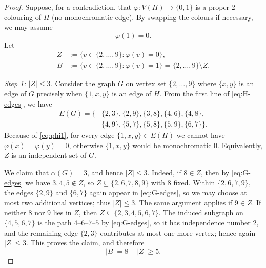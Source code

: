 \documentclass[11pt]{amsart}
\theoremstyle{definition}
\theoremstyle{remark}
\newcommand{\V}{V}
\newcommand{\E}{E}
\begin{document}
\begin{proof}
Suppose, for a contradiction, that $\varphi:\V(H)\to\{0,1\}$ is a proper $2$-colouring of $H$ (no monochromatic edge).
By swapping the colours if necessary, we may assume
\begin{equation}\label{eq:phi1}
\varphi(1)=0.
\end{equation}
Let
\[
\begin{aligned}
Z&:=\{v\in\{2,\dots,9\}:\varphi(v)=0\},\\
B&:=\{v\in\{2,\dots,9\}:\varphi(v)=1\}=\{2,\dots,9\}\setminus Z.
\end{aligned}
\]

\smallskip
\noindent\emph{Step 1: $|Z|\le 3$.}
Consider the graph $G$ on vertex set $\{2,\dots,9\}$ where $\{x,y\}$ is an edge of $G$ precisely when $\{1,x,y\}$ is an edge of $H$.
From the first line of \eqref{eq:H-edges}, we have
\begin{equation}\label{eq:G-edges}
\begin{aligned}
\E(G)=\{&
\{2,3\},\{2,9\},\{3,8\},\{4,6\},\{4,8\},\\
&
\{4,9\},\{5,7\},\{5,8\},\{5,9\},\{6,7\}\}.
\end{aligned}
\end{equation}
Because of \eqref{eq:phi1}, for every edge $\{1,x,y\}\in \E(H)$ we cannot have $\varphi(x)=\varphi(y)=0$, otherwise $\{1,x,y\}$ would be monochromatic $0$.
Equivalently, $Z$ is an independent set of $G$.

We claim that $\alpha(G)=3$, and hence $|Z|\le 3$.
Indeed, if $8\in Z$, then by \eqref{eq:G-edges} we have $3,4,5\notin Z$, so $Z\subseteq\{2,6,7,8,9\}$ with $8$ fixed.
Within $\{2,6,7,9\}$, the edges $\{2,9\}$ and $\{6,7\}$ again appear in \eqref{eq:G-edges}, so we may choose at most two additional vertices; thus $|Z|\le 3$.
The same argument applies if $9\in Z$.
If neither $8$ nor $9$ lies in $Z$, then $Z\subseteq\{2,3,4,5,6,7\}$.
The induced subgraph on $\{4,5,6,7\}$ is the path $4$--$6$--$7$--$5$ by \eqref{eq:G-edges}, so it has independence number $2$, and the remaining edge $\{2,3\}$ contributes at most one more vertex; hence again $|Z|\le 3$.
This proves the claim, and therefore
\begin{equation}\label{eq:B-size}
|B|=8-|Z|\ge 5.
\end{equation}


\end{proof}
\end{document}

